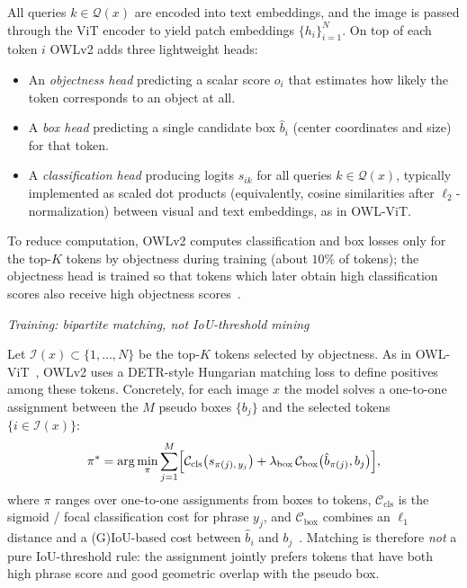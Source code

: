\begin{enrichment}
\begin{enrichment}
\begin{enumerate}
			All queries $k \in \mathcal{Q}(x)$ are encoded into text embeddings, and the image is passed through the ViT encoder to yield patch embeddings $\{h_i\}_{i=1}^N$. On top of each token $i$ OWLv2 adds three lightweight heads:
			\begin{itemize}
				\item An \emph{objectness head} predicting a scalar score $o_i$ that estimates how likely the token corresponds to an object at all.
				\item A \emph{box head} predicting a single candidate box $\hat{b}_i$ (center coordinates and size) for that token.
				\item A \emph{classification head} producing logits $s_{ik}$ for all queries $k \in \mathcal{Q}(x)$, typically implemented as scaled dot products (equivalently, cosine similarities after $\ell_2$-normalization) between visual and text embeddings, as in OWL-ViT.
			\end{itemize}
			To reduce computation, OWLv2 computes classification and box losses only for the top-$K$ tokens by objectness during training (about $10\%$ of tokens); the objectness head is trained so that tokens which later obtain high classification scores also receive high objectness scores~\cite{minderer2024_owlvitv2}.
			
			\medskip
			\noindent
			\emph{Training: bipartite matching, not IoU-threshold mining}
			
			Let $\mathcal{I}(x) \subset \{1,\dots,N\}$ be the top-$K$ tokens selected by objectness. As in OWL-ViT~\cite{minderer2022_owlvit}, OWLv2 uses a DETR-style Hungarian matching loss to define positives among these tokens. Concretely, for each image $x$ the model solves a one-to-one assignment between the $M$ pseudo boxes $\{b_j\}$ and the selected tokens $\{i \in \mathcal{I}(x)\}$:
			\[
			\pi^*
			=
			\arg\min_{\pi}
			\sum_{j=1}^M
			\Bigl[
			\mathcal{C}_\text{cls}\bigl(s_{\pi(j),\,y_j}\bigr)
			+
			\lambda_\text{box}\,\mathcal{C}_\text{box}\bigl(\hat{b}_{\pi(j)}, b_j\bigr)
			\Bigr],
			\]
			where $\pi$ ranges over one-to-one assignments from boxes to tokens, $\mathcal{C}_\text{cls}$ is the sigmoid / focal classification cost for phrase $y_j$, and $\mathcal{C}_\text{box}$ combines an $\ell_1$ distance and a (G)IoU-based cost between $\hat{b}_i$ and $b_j$~\cite{minderer2022_owlvit}. Matching is therefore \emph{not} a pure IoU-threshold rule: the assignment jointly prefers tokens that have both high phrase score and good geometric overlap with the pseudo box.
			

\end{enumerate}
\end{enrichment}
\end{enrichment}
